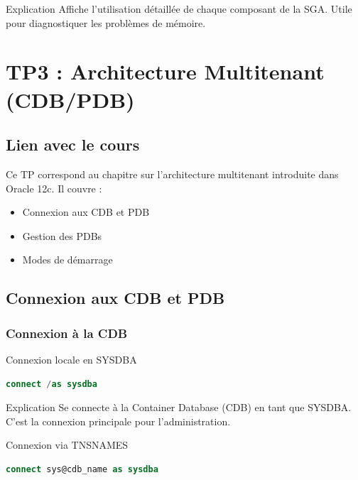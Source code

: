 \documentclass[12pt,a4paper]{article}
\begin{document}
\begin{explication}{Explication}
Affiche l'utilisation détaillée de chaque composant de la SGA. Utile pour diagnostiquer les problèmes de mémoire.
\end{explication}

\section{TP3 : Architecture Multitenant (CDB/PDB)}

\subsection{Lien avec le cours}

Ce TP correspond au chapitre sur l'architecture multitenant introduite dans Oracle 12c. Il couvre :
\begin{itemize}
    \item Connexion aux CDB et PDB
    \item Gestion des PDBs
    \item Modes de démarrage
\end{itemize}

\subsection{Connexion aux CDB et PDB}

\subsubsection{Connexion à la CDB}

\begin{commande}{Connexion locale en SYSDBA}
\begin{lstlisting}[language=SQL]
connect /as sysdba
\end{lstlisting}
\end{commande}

\begin{explication}{Explication}
Se connecte à la Container Database (CDB) en tant que SYSDBA. C'est la connexion principale pour l'administration.
\end{explication}

\begin{commande}{Connexion via TNSNAMES}
\begin{lstlisting}[language=SQL]
connect sys@cdb_name as sysdba
\end{lstlisting}
\end{commande}
\end{document}
